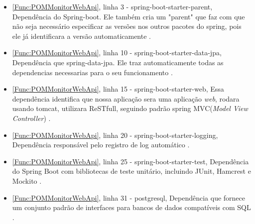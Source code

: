 \begin{itemize}\label{List:Pom}
		\item \autoref{Func:POMMonitorWebApi}, linha 3 - spring-boot-starter-parent, Dependência do Spring-boot. Ele também cria um "parent" que faz com que não seja necessário especificar as versões nos outros pacotes do spring, pois ele já identificara a versão automaticamente \cite{springBoot:2017}.
		
		\item \autoref{Func:POMMonitorWebApi}, linha 10 - spring-boot-starter-data-jpa, Dependência que spring-data-jpa. Ele traz automaticamente todas as dependencias necessarias para o seu funcionamento \cite{springDataJpa:2017}.
		
		\item \autoref{Func:POMMonitorWebApi}, linha 15 - spring-boot-starter-web, Essa dependência identifica que nossa aplicação sera uma aplicação \textit{web}, rodara usando tomcat, utilizara ReSTfull, seguindo padrão spring MVC(\textit{Model View Controller}) \cite{springBoot:2017}.
		
		\item \autoref{Func:POMMonitorWebApi}, linha 20 - spring-boot-starter-logging, Dependência responsável pelo registro de log automático \cite{springBoot:2017}.
		
		\item \autoref{Func:POMMonitorWebApi}, linha 25 - spring-boot-starter-test, Dependência do Spring Boot com bibliotecas de teste unitário, incluindo JUnit, Hamcrest e Mockito \cite{springBoot:2017}.
		
		\item \autoref{Func:POMMonitorWebApi}, linha 31 - postgresql, Dependência que fornece um conjunto padrão de interfaces para bancos de dados compatíveis com SQL \cite{PostgreSQL:2017}.
	
\end{itemize}


